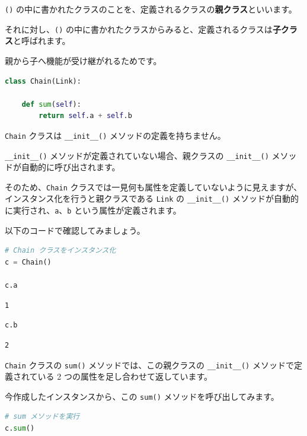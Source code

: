 \texttt{()} の中に書かれたクラスのことを、定義されるクラスの\textbf{親クラス}といいます。

それに対し、\texttt{()} の中に書かれたクラスからみると、定義されるクラスは\textbf{子クラス}と呼ばれます。

親から子へ機能が受け継がれるためです。


\begin{lstlisting}[style=codecell,language=Python]
class Chain(Link):
    
    def sum(self):
        return self.a + self.b
\end{lstlisting}

\texttt{Chain} クラスは \texttt{\_\_init\_\_()} メソッドの定義を持ちません。

\texttt{\_\_init\_\_()} メソッドが定義されていない場合、親クラスの \texttt{\_\_init\_\_()}  メソッドが自動的に呼び出されます。

そのため、\texttt{Chain} クラスでは一見何も属性を定義していないように見えますが、インスタンス化を行うと親クラスである \texttt{Link} の \texttt{\_\_init\_\_()}  メソッドが自動的に実行され、\texttt{a}、\texttt{b} という属性が定義されます。

以下のコードで確認してみましょう。


\begin{lstlisting}[style=codecell,language=Python]
# Chain クラスをインスタンス化
c = Chain()

c.a
\end{lstlisting}

\begin{lstlisting}[style=outputcell]
1
\end{lstlisting}

\begin{lstlisting}[style=codecell,language=Python]
c.b
\end{lstlisting}

\begin{lstlisting}[style=outputcell]
2
\end{lstlisting}

\texttt{Chain} クラスの \texttt{sum()} メソッドでは、この親クラスの \texttt{\_\_init\_\_()}  メソッドで定義されている 2 つの属性を足し合わせて返しています。

今作成したインスタンスから、この \texttt{sum()} メソッドを呼び出してみます。


\begin{lstlisting}[style=codecell,language=Python]
# sum メソッドを実行
c.sum()
\end{lstlisting}

